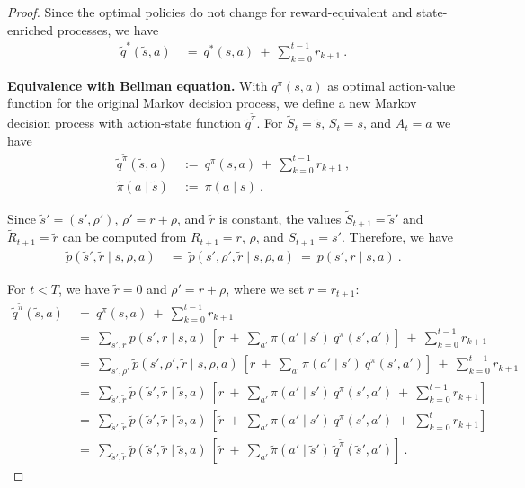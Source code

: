 \documentclass{article}
\begin{document}
\begin{appendices}
\begin{proof}
Since the optimal policies do not change for
reward-equivalent and state-enriched processes,
we have
\begin{align}
 \tilde{q}^*(\tilde{s},a) \ &= \ q^*(s,a) \ + \ \sum_{k=0}^{t-1}  r_{k+1}\ .
\end{align} 



{\bf Equivalence with Bellman equation.}
With $q^\pi(s,a)$ as optimal action-value function for the
original Markov decision process, we define a new Markov
decision process with action-state function $\tilde{q}^{\tilde{\pi}}$.
For $\tilde{S}_t=\tilde{s}$, $S_t=s$, and $A_t=a$ we have
\begin{align}
 \tilde{q}^{\tilde{\pi}}(\tilde{s},a) \ &:= \ q^\pi(s,a) \ + \
 \sum_{k=0}^{t-1}  r_{k+1} \ , \\
 \tilde{\pi}(a \mid \tilde{s}) \ &:= \  \pi(a \mid s) \ .
\end{align} 

Since $\tilde{s}'=(s',\rho')$, $\rho'=r+\rho$, and $\tilde{r}$ is
constant, the values $\tilde{S}_{t+1}=\tilde{s}'$ and
$\tilde{R}_{t+1}=\tilde{r}$
can be computed from
$R_{t+1}=r$, $\rho$, and $S_{t+1}=s'$. Therefore, we have 
\begin{align}
\tilde{p}(\tilde{s}',\tilde{r}\mid s,\rho,a)\ &= \ \tilde{p}(s',\rho',\tilde{r}\mid s,\rho,a)\ = \ p(s',r\mid s,a) \ .
\end{align} 


For $t < T$, we have $\tilde{r}=0$ and $\rho'=r+\rho$, where we set
$r=r_{t+1}$:
\begin{align}
  \tilde{q}^{\tilde{\pi}}(\tilde{s},a) \ &= \ q^\pi(s,a) \ + \ \sum_{k=0}^{t-1} 
  r_{k+1} \\ \nonumber
  &= \ \sum_{s',r} p(s',r\mid s,a) \ 
  \left[r \ + \ \sum_{a'} \pi(a' \mid s') \ q^\pi(s',a')  \right]  \ +
  \
  \sum_{k=0}^{t-1}  r_{k+1} \\ \nonumber
  &= \ \sum_{s',\rho'} \tilde{p}(s',\rho', \tilde{r}\mid s,\rho,a) \ 
  \left[r \ + \ \sum_{a'} \pi(a' \mid s') \ q^\pi(s',a')  \right]
  \ + \ \sum_{k=0}^{t-1}  r_{k+1} \\ \nonumber
  &= \ \sum_{\tilde{s}', \tilde{r}} \tilde{p}(\tilde{s}', \tilde{r}\mid \tilde{s},a) \ 
  \left[ r \ + \ \sum_{a'} \pi(a' \mid s') \ q^\pi(s',a')   \ + \
    \sum_{k=0}^{t-1}  r_{k+1}\right]  \\ \nonumber
  &= \  \sum_{\tilde{s}', \tilde{r}} \tilde{p}(\tilde{s}', \tilde{r}\mid
  \tilde{s},a) \ 
  \left[\tilde{r} \ + \ \sum_{a'} \pi(a' \mid s') \ q^\pi(s',a')   \ + \
    \sum_{k=0}^{t}  r_{k+1} \right]  \\ \nonumber
  &= \ \sum_{\tilde{s}', \tilde{r}} \tilde{p}(\tilde{s}', \tilde{r}\mid
  \tilde{s},a) \ 
  \left[\tilde{r} \ + \ \sum_{a'} \tilde{\pi}(a' \mid \tilde{s}') \
  \tilde{q}^{\tilde{\pi}}(\tilde{s}',a')
  \right]  \ .
\end{align} 


\end{proof}
\end{appendices}
\end{document}
